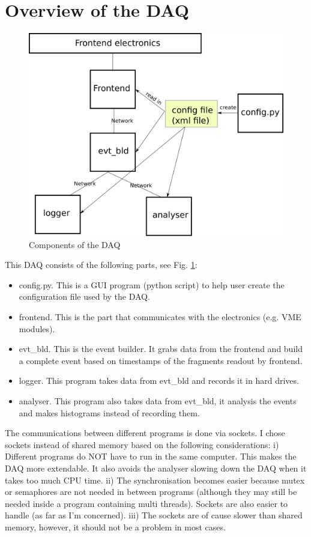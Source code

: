 \documentclass[a4paper,12pt]{article}
\begin{document}
	\section{Overview of the DAQ}
	\begin{figure}
		\begin{center}
			\includegraphics[width=.4\textwidth]{figs/daq_scheme.eps}
			\caption{\label{fig01}Components of the DAQ }
		\end{center}
	\end{figure}
	This DAQ consists of the following parts, see Fig. \ref{fig01}:
	\begin{itemize}
		\item config.py. This is a GUI program (python script) to help user
			create the configuration file used by the DAQ.
		\item frontend. This is the part that communicates with the
			electronics (e.g. VME modules).
		\item evt\_bld. This is the event builder. It grabs data from the
			frontend and build a complete event based on timestamps of the
			fragments readout by frontend.
		\item logger. This program takes data from evt\_bld and records it
			in hard drives.
		\item analyser. This program also takes data from evt\_bld, it
			analysis the events and makes histograms instead of recording
			them.
	\end{itemize}
	The communications between different programs is done via sockets. I
	chose sockets instead of shared memory based on the following
	considerations:
	 i) Different programs do NOT have to run in the same computer. This
	 makes the DAQ more extendable. It also avoids the analyser slowing down
	 the DAQ when it takes too much CPU time.
	 ii) The synchronisation becomes easier because mutex or semaphores are
	 not needed in between programs (although they may still be needed
	 inside a program containing multi threads). Sockets are also easier to
	 handle (as far as I'm concerned).
	 iii) The sockets are of cause slower than shared memory, however, it
	 should not be a problem in most cases.
\end{document}
